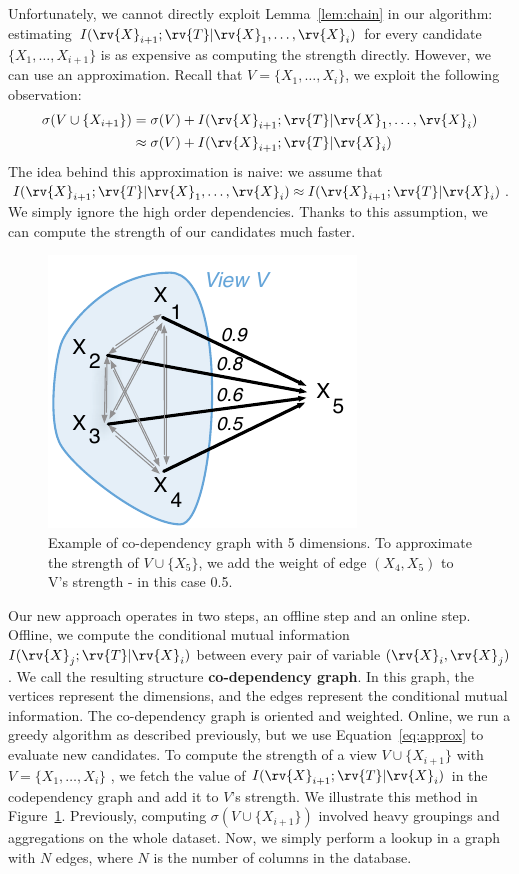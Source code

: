 Unfortunately, we cannot directly exploit Lemma~\ref{lem:chain} in our
algorithm: estimating $I(\rv{X}_{i+1} ; \rv{T} | \rv{X}_1 , \ldots, \rv{X}_i)$
for every candidate $\{X_1, \ldots, X_{i+1}\}$ is as expensive as computing
the strength directly.  However, we can use an approximation.
Recall that $V = \{X_1, \ldots, X_i\}$, we exploit the following observation:
\begin{equation}\label{eq:approx}
\begin{split}
    \sigma(V \cup \{X_{i+1}\}) & = \sigma(V)   + I(\rv{X}_{i+1} ; \rv{T} |
    \rv{X}_1, \ldots, \rv{X}_{i})\\
    & \approx \sigma(V) + I(\rv{X}_{i+1} ; \rv{T} | \rv{X}_{i})
\end{split}
\end{equation}
The idea behind this approximation is naive: we assume that $I(\rv{X}_{i+1} ;
\rv{T} | \rv{X}_1, \ldots, \rv{X}_{i}) \approx I(\rv{X}_{i+1} ; \rv{T} |
\rv{X}_{i})$. We simply ignore the high order dependencies. Thanks to this
assumption, we can compute the strength of our candidates much faster. 

\begin{figure}[t!]
\centering
\includegraphics[width=0.4\columnwidth]{images/codependency}
\caption{Example of co-dependency graph with 5 dimensions. To approximate the
strength of $V \cup \{X_5\}$, we add the weight of edge $(X_4, X_5)$ to V's
strength -  in this case 0.5.}
\label{pic:codependency}
\end{figure}
Our new approach operates in two steps, an offline step and an online step.
Offline, we compute the conditional mutual information  $ I(\rv{X}_j ; \rv{T} |
\rv{X}_i)$ between every pair of variable $(\rv{X}_i, \rv{X}_j)$. We call the
resulting structure \textbf{co-dependency graph}. In this graph, the vertices
represent the dimensions, and the edges represent the conditional mutual
information. The co-dependency graph is oriented and weighted.  Online, we run
a greedy algorithm as described previously, but we use Equation~\ref{eq:approx}
to evaluate new candidates.  To compute the strength of a view $V \cup
\{X_{i+1}\}$ with  $V= \{X_1, \ldots, X_i\}$ , we fetch the value of  $
I(\rv{X}_{i+1} ; \rv{T} | \rv{X}_i)$ in the codependency graph and add it to
$V$'s strength. We illustrate this method in Figure~\ref{pic:codependency}.
Previously, computing $\sigma(V \cup \{X_{i+1}\})$ involved heavy groupings and
aggregations on the whole dataset.  Now, we simply perform a lookup in a graph
with $N$ edges, where $N$ is the number of columns in the database.

